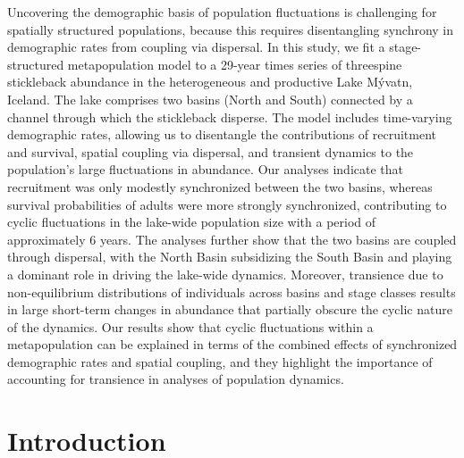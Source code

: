 \documentclass[11pt]{article}
\begin{document}
Uncovering the demographic basis of population fluctuations is challenging 
for spatially structured populations, 
because this requires disentangling synchrony in demographic rates 
from coupling via dispersal. 
In this study, we fit a stage-structured metapopulation model to a 29-year times series 
of threespine stickleback abundance in the heterogeneous 
and productive Lake M\'{y}vatn, Iceland. 
The lake comprises two basins (North and South) connected by a channel 
through which the stickleback disperse. 
The model includes time-varying demographic rates, 
allowing us to disentangle the contributions of recruitment and survival, 
spatial coupling via dispersal, and transient dynamics 
to the population’s large fluctuations in abundance. 
Our analyses indicate that recruitment was only modestly synchronized between the two basins, 
whereas survival probabilities of adults were more strongly synchronized, 
contributing to cyclic fluctuations in the lake-wide population size 
with a period of approximately 6 years. 
The analyses further show that the two basins are coupled through dispersal, 
with the North Basin subsidizing the South Basin and playing a dominant role 
in driving the lake-wide dynamics. 
Moreover, transience due to non-equilibrium distributions of individuals 
across basins and stage classes results in large short-term changes in abundance 
that partially obscure the cyclic nature of the dynamics. 
Our results show that cyclic fluctuations within a metapopulation 
can be explained in terms of the combined effects 
of synchronized demographic rates and spatial coupling, 
and they highlight the importance 
of accounting for transience in analyses of population dynamics.





\newpage{}

\section*{Introduction} \label{introduction}
\end{document}
